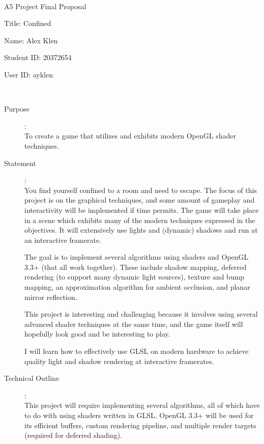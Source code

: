 \documentclass {article}
\begin{document}
~\vfill
\begin{center}
  \Large

  A5 Project Final Proposal

  Title: Confined

  Name: Alex Klen

  Student ID: 20372654

  User ID: ayklen
\end{center}
\vfill ~\vfill~
\newpage
{}
\begin{description}
  \item[Purpose]:\\
    To create a game that utilizes and exhibits modern OpenGL shader techniques.

  \item[Statement]:\\
    You find yourself confined to a room and need to escape. The focus of this project is on the graphical techniques, and some amount of gameplay and interactivity will be implemented if time permits.
    The game will take place in a scene which exhibits many of the modern techniques expressed in the objectives.
    It will extensively use lights and (dynamic) shadows and run at an interactive framerate.

    The goal is to implement several algorithms using shaders and OpenGL 3.3+ (that all work together).
    These include shadow mapping, deferred rendering (to support many dynamic light sources), texture and bump mapping, an approximation algorithm for ambient occlusion, and planar mirror reflection.

    This project is interesting and challenging because it involves using several advanced shader techniques at the same time, and the game itself will hopefully look good and be interesting to play.

    I will learn how to effectively use GLSL on modern hardware to achieve quality light and shadow rendering at interactive framerates.

  \item[Technical Outline]:\\
    This project will require implementing several algorithms, all of which have to do with using shaders written in GLSL.
    OpenGL 3.3+ will be used for its efficient buffers, custom rendering pipeline, and multiple render targets (required for deferred shading).


\end{description}
\end{document}
